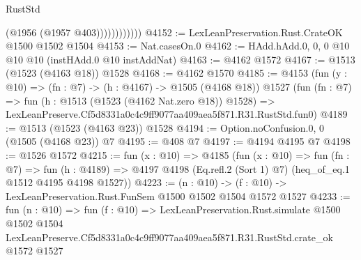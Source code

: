 \begin{lexlean}{RustStd}
\begin{coremodule}
                        (@1956 (@1957 @403))))))))))))
@4152 := LexLeanPreservation.Rust.CrateOK @1500 @1502 @1504
@4153 := Nat.casesOn.{0}
@4162 := HAdd.hAdd.{0, 0, 0} @10 @10 @10 (instHAdd.{0} @10 instAddNat)
@4163 := @4162 @1572
@4167 := @1513 (@1523 (@4163 @18)) @1528
@4168 := @4162 @1570
@4185 := @4153
    (fun (y : @10) => (fn : @7) -> (h : @4167) -> @1505 (@4168 @18))
    @1527
    (fun (fn : @7) =>
    fun (h : @1513 (@1523 (@4162 Nat.zero @18)) @1528) =>
    LexLeanPreserve.Cf5d8331a0c4c9ff9077aa409aea5f871.R31.RustStd.fun0)
@4189 := @1513 (@1523 (@4163 @23)) @1528
@4194 := Option.noConfusion.{0, 0} (@1505 (@4168 @23)) @7
@4195 := @408 @7
@4197 := @4194 @4195 @7
@4198 := @1526 @1572
@4215 := fun (x : @10) =>
  @4185
    (fun (x : @10) =>
    fun (fn : @7) =>
    fun (h : @4189) =>
    @4197 @4198 (Eq.refl.{2} (Sort 1) @7) (heq_of_eq.{1} @1512 @4195 @4198 @1527))
@4223 := (n : @10) -> (f : @10) -> LexLeanPreservation.Rust.FunSem @1500 @1502 @1504 @1572 @1527
@4233 := fun (n : @10) =>
  fun (f : @10) =>
  LexLeanPreservation.Rust.simulate
    @1500
    @1502
    @1504
    LexLeanPreserve.Cf5d8331a0c4c9ff9077aa409aea5f871.R31.RustStd.crate_ok
    @1572
    @1527
\end{coremodule}
\end{lexlean}
